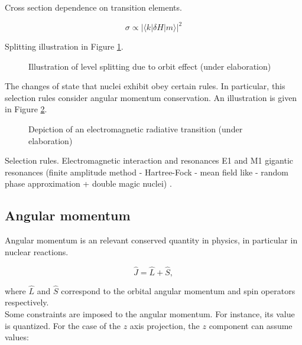 \documentclass[openany]{book}
\begin{document}
Cross section dependence on transition elements.

\begin{equation} \label{eq:perturbationTheory_crossSection}
	\sigma \propto |\langle k | \delta H|m \rangle|^2
\end{equation}

Splitting illustration in Figure \ref{fig:spinOrbitSplitting}.

\begin{figure}[H]
	
	\caption[Spin orbit splitting representation]{Illustration of level splitting due to orbit effect (under elaboration)}
	\label{fig:spinOrbitSplitting}
\end{figure}

The changes of state that nuclei exhibit obey certain rules. In particular, this selection rules consider angular momentum conservation. An illustration is given in Figure \ref{fig:radiativeEMTransition}. \\

\begin{figure}[H]
	
	\caption[Radiative transition illustration]{Depiction of an electromagnetic radiative transition (under elaboration)}
	\label{fig:radiativeEMTransition}
\end{figure}

Selection rules. Electromagnetic interaction and resonances E1 and M1 gigantic resonances (finite amplitude method - Hartree-Fock - mean field like - random phase approximation + double magic nuclei) \cite{sasaki_kawano_stetcu_2022}.

\subsection{Angular momentum}  \label{sub:quantumAngularMomentum}

Angular momentum is an relevant conserved quantity in physics, in particular in nuclear reactions.

\begin{equation} \label{eq:angularMomentum_definition}
	\hat J = \hat L + \hat S,
\end{equation}

where $\hat L$ and $\hat S$ correspond to the orbital angular momentum and spin operators respectively. \\

Some constraints are imposed to the angular momentum. For instance, its value is quantized. For the case of the $z$ axis projection, the $z$ component can assume values:
\end{document}
